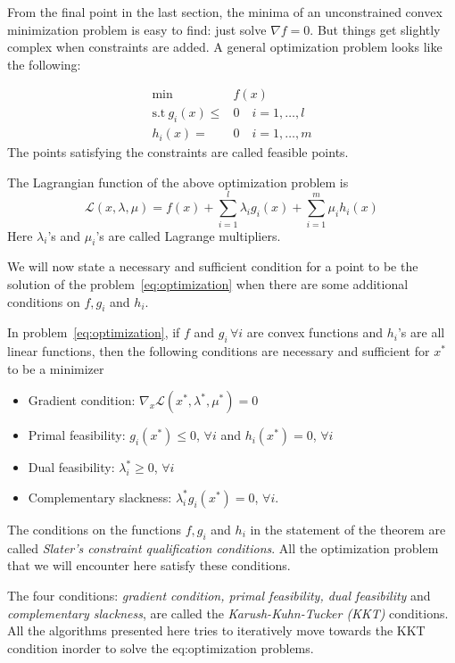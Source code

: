 From the final point in the last section, the minima of an
unconstrained convex minimization problem is easy to find:
just solve $\nabla f = 0$. But things get slightly complex
when constraints are added. A general optimization
problem looks like the following:

\begin{equation}\label{eq:optimization}
\begin{split}
\min& f(x)\\
\text{s.t}\ g_i(x)\leq& 0\quad i=1,\ldots,l\\
			h_i(x) = &0\quad i=1,\ldots,m
\end{split}
\end{equation}
The points satisfying the constraints are called feasible points.

The Lagrangian function of the above optimization problem is
\begin{equation*}
	\mathcal{L}(x, \lambda, \mu) = f(x) + \sum_{i=1}^l \lambda_i g_i(x)
	+ \sum_{i=1}^m \mu_i h_i(x)
\end{equation*}
Here $\lambda_i$'s and $\mu_i$'s are called Lagrange multipliers.

We will now state a necessary and sufficient condition for
a point to be the solution of the problem~\eqref{eq:optimization}
when there are some additional conditions on $f, g_i$ and $h_i$.

\begin{theorem}
	In problem~\eqref{eq:optimization}, if $f$ and $g_i\,\forall i$
	are convex functions and $h_i$'s are all linear functions,
	then the following conditions are necessary and sufficient
	for $x^*$ to be a minimizer
	\begin{itemize}
		\item Gradient condition: $\nabla_x\mathcal{L}
			(x^*, \lambda^*, \mu^*) = 0$

		\item Primal feasibility: $g_i(x^*)\leq 0$, $\forall i$ and
			$h_i(x^*) = 0$, $\forall i$

		\item Dual feasibility: $\lambda_i^*\geq 0$, $\forall i$

		\item Complementary slackness: $\lambda_i^*g_i(x^*) = 0$,
			$\forall i$.
	\end{itemize}
\end{theorem}

The conditions on the functions $f, g_i$ and $h_i$ in the
statement of the theorem
are called \emph{Slater's constraint qualification conditions}.
All the optimization problem that we will encounter here satisfy
these conditions.

The four conditions: \emph{gradient condition, primal feasibility,
dual feasibility} and \emph{complementary slackness}, are
called the \emph{Karush-Kuhn-Tucker (KKT)}
conditions. All the algorithms presented here
tries to iteratively move towards the KKT condition inorder
to solve the eq:optimization problems.
